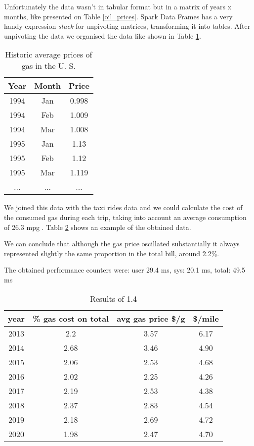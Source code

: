 \documentclass[conference,compsoc]{IEEEtran}
\begin{document}
Unfortunately the data wasn't in tabular format but in a matrix of years x months, like presented on Table \ref{oil_prices}. Spark Data Frames has a very handy expression \textit{stack} for unpivoting matrices, transforming it into tables. After unpivoting the data we organised the data like shown in Table \ref{oil_prices_tabular}.

\begin{table}[!t]
\renewcommand{\arraystretch}{1.3}
\caption{Historic average prices of gas in the U. S.}
\label{oil_prices_tabular}
\centering
\begin{tabular}{c|c||c}
\hline
\bfseries Year& \bfseries Month& \bfseries Price\\
\hline\hline
1994&  Jan&0.998\\
1994&  Feb&1.009\\
1994&  Mar&1.008\\
1995&  Jan& 1.13\\
1995&  Feb& 1.12\\
1995&  Mar&1.119\\
...&  ...&...\\
\hline
\end{tabular}
\end{table}

We joined this data with the taxi rides data and we could calculate the cost of the consumed gas during each trip, taking into account an average consumption of 26.3 mpg \cite{IEEEhowto:fuel_eco}. Table \ref{output_1_4} shows an example of the obtained data. \par
We can conclude that although the gas price oscillated substantially it always represented slightly the same proportion in the total bill, around 2.2\%.
\par\par
The obtained performance counters were: user 29.4 ms, sys: 20.1 ms, total: 49.5 ms

\begin{table}[!t]
\renewcommand{\arraystretch}{1.3}
\caption{Results of 1.4}
\label{output_1_4}
\centering
\begin{tabular}{c||c|c|c}
\hline
\bfseries year & \bfseries \% gas cost on total& \bfseries avg gas price \$/g & \bfseries \$/mile\\
\hline\hline
2013&2.2                &3.57             &6.17  \\
2014&2.68               &3.46             &4.90   \\
2015&2.06               &2.53             &4.68  \\
2016&2.02               &2.25             &4.26  \\
2017&2.19               &2.53             &4.38  \\
2018&2.37               &2.83             &4.54  \\
2019&2.18               &2.69             &4.72  \\
2020&1.98               &2.47             &4.70   \\
\hline
\end{tabular}
\end{table}
\end{document}
